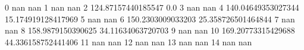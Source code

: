 0 nan nan
1 nan nan
2 124.87157440185547 0.0
3 nan nan
4 140.04649353027344 15.174919128417969
5 nan nan
6 150.2303009033203 25.358726501464844
7 nan nan
8 158.9879150390625 34.11634063720703
9 nan nan
10 169.20773315429688 44.336158752441406
11 nan nan
12 nan nan
13 nan nan
14 nan nan
